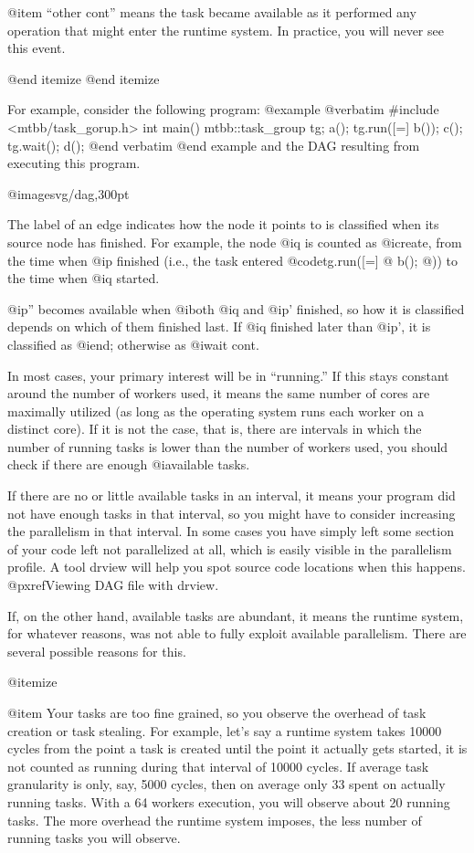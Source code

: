 @item ``other cont'' means the task became available as it performed any operation that might enter the runtime system.  In practice, you will never see this event.

@end itemize
@end itemize

For example, consider the following program:
@example
@verbatim
#include <mtbb/task_gorup.h>
int main() {
  mtbb::task_group tg;
  a();
  tg.run([=] b());
  c();
  tg.wait();
  d();
}
@end verbatim
@end example
and the DAG resulting from executing this program.

@image{svg/dag,300pt}

The label of an edge indicates how the node it points to is classified
when its source node has finished.  For example, the node @i{q} is
counted as @i{create}, from the time when @i{p} finished (i.e., the task
entered @code{tg.run([=] @{ b(); @})}) to the time when @i{q} started.

@i{p''} becomes available when @i{both} @i{q} and @i{p'} finished, so
how it is classified depends on which of them finished last.  If @i{q}
finished later than @i{p'}, it is classified as @i{end}; otherwise as
@i{wait cont}.

In most cases, your primary interest will be in ``running.''  If this
stays constant around the number of workers used, it means the same
number of cores are maximally utilized (as long as the operating system
runs each worker on a distinct core).  If it is not the case, that is,
there are intervals in which the number of running tasks is lower than
the number of workers used, you should check if there are enough
@i{available} tasks.

If there are no or little available tasks in an interval, it means your
program did not have enough tasks in that interval, so you might have to
consider increasing the parallelism in that interval.  In some cases you
have simply left some section of your code left not parallelized at all,
which is easily visible in the parallelism profile.  A tool drview will
help you spot source code locations when this happens.  
@pxref{Viewing DAG file with drview}.

If, on the other hand, available tasks are abundant, it means the
runtime system, for whatever reasons, was not able to fully exploit
available parallelism.  There are several possible reasons for this.

@itemize

@item Your tasks are too fine grained, so you observe the overhead
of task creation or task stealing.  For example, let's say a runtime
system takes 10000 cycles from the point a task is created until the
point it actually gets started, it is not counted as running during that
interval of 10000 cycles.  If average task granularity is only, say,
5000 cycles, then on average only 33%
spent on actually running tasks.  With a 64 workers execution, you will
observe about 20 running tasks.  The more overhead the runtime system
imposes, the less number of running tasks you will observe.

